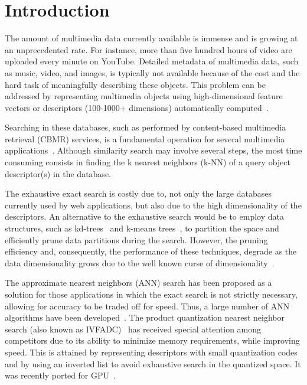 \chapter{Introduction}
\label{sec:intro}

The amount of multimedia data currently available is immense and is growing at an unprecedented rate. For instance, more than five hundred hours of video are uploaded every minute on YouTube. Detailed metadata of multimedia data, such as music, video, and images, is typically not available because of the cost and the hard task of meaningfully describing these objects. This problem can be addressed by representing multimedia objects using high-dimensional feature vectors or descriptors (100-1000+ dimensions) automatically computed~\cite{Wan:2014:DLC:2647868.2654948,10.1007/978-3-319-10584-0_26,Douze:2009:EGD:1646396.1646421}. 

Searching in these databases, such as performed by content-based multimedia retrieval (CBMR) services, is a fundamental operation for several multimedia applications~\cite{Bohm2001322}. Although similarity search may involve several steps, the most time consuming consists in finding the k nearest neighbors (k-NN) of a query object descriptor(s) in the database. 

The exhaustive exact search is costly due to, not only the large databases currently used by web applications, but also due to the high dimensionality of the descriptors. An alternative to the exhaustive search would be to employ data structures, such as kd-trees~\cite{Friedman1977209} and k-means trees~\cite{Muja2009331}, to partition the space and efficiently prune data partitions during the search. However, the pruning efficiency and, consequently, the performance of these techniques, degrade as the data dimensionality grows due to the well known curse of dimensionality~\cite{Weber:1998:QAP:645924.671192}. 

The approximate nearest neighbors (ANN) search has been proposed as a solution for those applications in which the exact search is not strictly necessary, allowing for accuracy to be traded off for speed. Thus, a large number of ANN algorithms have been developed~\cite{Gionis:1999:SSH:645925.671516,5432202,NIPS2009_3864,6809191,Muja2009331}. The product quantization nearest neighbor search (also known as IVFADC)~\cite{5432202} has received special attention among competitors due to its ability to minimize memory requirements, while improving speed. This is attained by representing descriptors with small quantization codes and by using an inverted list to avoid exhaustive search in the quantized space. It was recently ported for GPU~\cite{8733051}.

